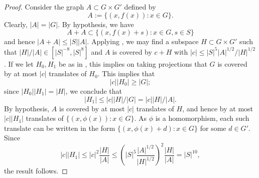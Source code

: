 \begin{proof}\leanok
Consider the graph $A \subset G \times G'$ defined by
$$ A := \{ (x,f(x)): x \in G \}.$$
Clearly, $|A| = |G|$.  By hypothesis, we have
$$ A+A \subset \{ (x,f(x)+s): x \in G, s \in S\}$$
and hence $|A+A| \leq |S| |A|$.  Applying , we may find a
subspace $H \subset G \times G'$ such that $|H|/ |A| \in [|S|^{-8}, |S|^{8}]$
and $A$ is covered by $c + H$ with $|c| \le |S|^5|A|^{1/2} / |H|^{1/2}$. If
we let $H_0, H_1$ be as in , this implies on taking projections
that $G$ is covered by at most $|c|$ translates of $H_0$. This implies that
$$ |c| |H_0| \geq |G|;$$
since $|H_0| |H_1| = |H|$, we conclude that
$$ |H_1| \leq |c| |H|/|G| = |c| |H|/|A|.$$
By hypothesis, $A$ is covered by at most $|c|$ translates of $H$, and hence
by at most $|c| |H_1|$ translates of $\{ (x,\phi(x)): x \in G \}$. As $\phi$
is a homomorphism, each such translate can be written in the form $\{
(x,\phi(x)+d): x \in G \}$ for some $d \in G'$. Since
$$
|c| |H_1| \le |c|^2 \frac{|H|}{|A|} \le \left(|S|^5 \frac{|A|^{1/2}}{|H|^{1/2}}\right)^2 \frac{|H|}{|A|}
= |S|^{10},
$$
the result follows.
\end{proof}

